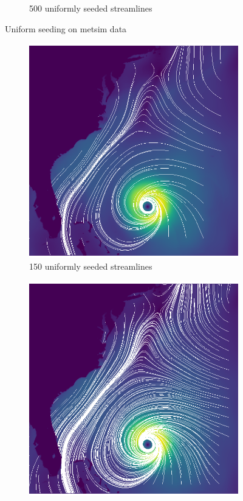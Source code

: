 \documentclass{article}
\begin{document}
\begin{figure}[h!]
\begin{subfigure}{0.6\textwidth}
        \caption{500 uniformly seeded streamlines}
    \end{subfigure}
    \caption{Uniform seeding on metsim data}
\end{figure}

\newpage
\begin{figure}[h!]
    \centering
    \begin{subfigure}{0.6\textwidth}
        \centering
        \includegraphics[width=\textwidth]{isabel_uniform_150.eps}
        \caption{150 uniformly seeded streamlines}
    \end{subfigure}
    \hfill
    \hfill
    \begin{subfigure}{0.6\textwidth}
        \centering
        \includegraphics[width=\textwidth]{isabel_uniform_500.eps}

\end{subfigure}
\end{figure}
\end{document}
